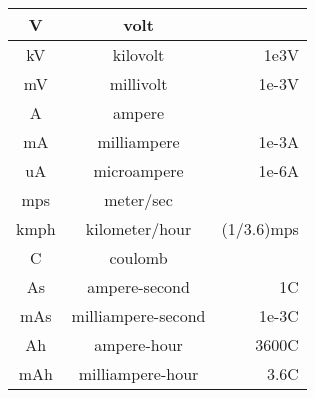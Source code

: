 \begin{longtable}{|c|c|r|}
  V & volt & \\\hline
  kV & kilovolt & 1e3V \\\hline
  mV & millivolt & 1e-3V \\\hline
  A & ampere & \\\hline
  mA & milliampere & 1e-3A \\\hline
  uA & microampere & 1e-6A \\\hline
  mps & meter/sec & \\\hline
  kmph & kilometer/hour & (1/3.6)mps \\\hline
  C & coulomb & \\\hline
  As & ampere-second & 1C \\\hline
  mAs & milliampere-second & 1e-3C \\\hline
  Ah & ampere-hour & 3600C \\\hline
  mAh & milliampere-hour & 3.6C \\\hline
\end{longtable}



